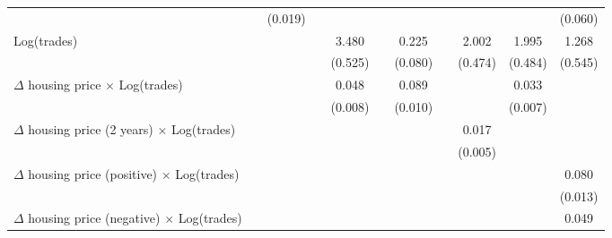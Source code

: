 \begin{sidewaystable}[htbp]
\begin{tabular}{l*{10}{c}}
                    &                    &     (0.019)        &                    &                    &                    &                    &                    &                    &                    &     (0.060)        \\
[1em]
Log(trades)         &                    &                    &                    &       3.480\sym{**}&                    &       0.225\sym{**}&                    &       2.002\sym{**}&       1.995\sym{**}&       1.268\sym{*} \\
                    &                    &                    &                    &     (0.525)        &                    &     (0.080)        &                    &     (0.474)        &     (0.484)        &     (0.545)        \\
[1em]
$\Delta$ housing price $\times$ Log(trades)&                    &                    &                    &       0.048\sym{**}&                    &       0.089\sym{**}&                    &                    &       0.033\sym{**}&                    \\
                    &                    &                    &                    &     (0.008)        &                    &     (0.010)        &                    &                    &     (0.007)        &                    \\
[1em]
$\Delta$ housing price (2 years) $\times$ Log(trades)&                    &                    &                    &                    &                    &                    &                    &       0.017\sym{**}&                    &                    \\
                    &                    &                    &                    &                    &                    &                    &                    &     (0.005)        &                    &                    \\
[1em]
$\Delta$ housing price (positive) $\times$ Log(trades)&                    &                    &                    &                    &                    &                    &                    &                    &                    &       0.080\sym{**}\\
                    &                    &                    &                    &                    &                    &                    &                    &                    &                    &     (0.013)        \\
[1em]
$\Delta$ housing price (negative) $\times$ Log(trades)&                    &                    &                    &                    &                    &                    &                    &                    &                    &       0.049\sym{*} \\

\end{tabular}
\end{sidewaystable}
